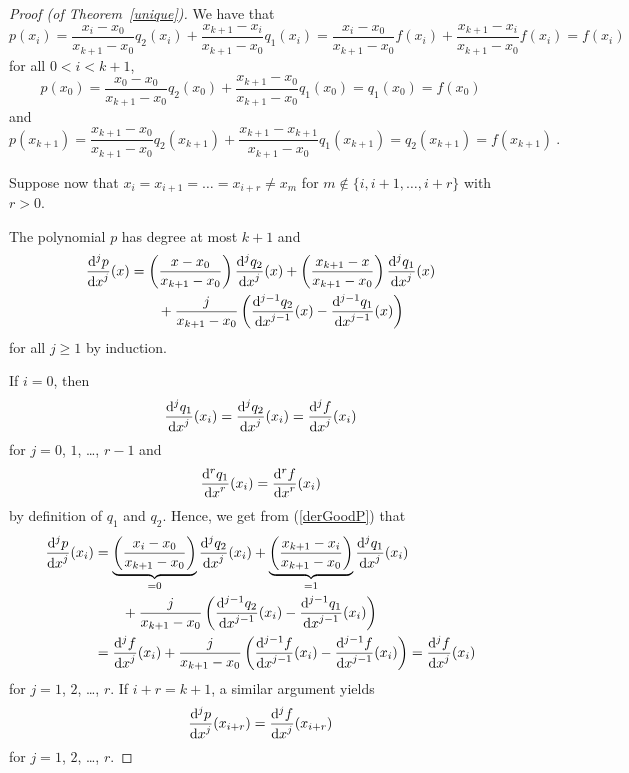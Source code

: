 \begin{proof}[Proof (of Theorem~\ref{unique})]
We have that
\[
p(x_i) = \frac{x_i-x_0}{x_{k+1}- x_0} q_2(x_i) +
\frac{x_{k+1}-x_i}{x_{k+1}- x_0} q_1(x_i)
= \frac{x_i-x_0}{x_{k+1}- x_0} f(x_i) +
\frac{x_{k+1}-x_i}{x_{k+1}- x_0} f(x_i) = f(x_i)
\]
for all $0<i<k+1$,
\[
p(x_0) = \frac{x_0-x_0}{x_{k+1}- x_0} q_2(x_0) +
\frac{x_{k+1}-x_0}{x_{k+1}- x_0} q_1(x_0)
= q_1(x_0) = f(x_0)
\]
and
\[
p(x_{k+1}) = \frac{x_{k+1}-x_0}{x_{k+1}- x_0} q_2(x_{k+1}) +
\frac{x_{k+1}-x_{k+1}}{x_{k+1}- x_0} q_1(x_{k+1})
= q_2(x_{k+1}) = f(x_{k+1}) \ .
\]

Suppose now that $x_i = x_{i+1} = \ldots = x_{i+r} \neq x_m$ for
$m \not\in \{i,i+1, \ldots, i+r\}$ with $r>0$.

The polynomial $p$ has degree at most $k+1$ and
\begin{equation}\label{derGoodP}
\begin{split}
\dydxn{p}{x}{j}(x)
&= \left(\frac{x-x_0}{x_{k+1}-x_0}\right)\dydxn{q_2}{x}{j}(x) +
\left(\frac{x_{k+1}-x}{x_{k+1}-x_0}\right) \dydxn{q_1}{x}{j}(x) \\
& \qquad + \frac{j}{x_{k+1}-x_0}\left(
\dydxn{q_2}{x}{j-1}(x)-\dydxn{q_1}{x}{j-1}(x)\right)
\end{split}
\end{equation}
for all $j\geq 1$ by induction.

If $i=0$, then
\[
\dydxn{q_1}{x}{j}(x_i) = \dydxn{q_2}{x}{j}(x_i) = \dydxn{f}{x}{j}(x_i)
\]
for $j=0$, $1$, \ldots, $r-1$ and
\[
\dydxn{q_1}{x}{r}(x_i) = \dydxn{f}{x}{r}(x_i)
\]
by definition of $q_1$ and $q_2$.  Hence, we get from (\ref{derGoodP})
that
\begin{align*}
\dydxn{p}{x}{j}(x_i)
& = \underbrace{\left(\frac{x_i-x_0}{x_{k+1}-x_0}\right)}_{=0}
\dydxn{q_2}{x}{j}(x_i) +
\underbrace{\left(\frac{x_{k+1}-x_i}{x_{k+1}-x_0}\right)}_{=1}
\dydxn{q_1}{x}{j}(x_i) \\
&\qquad  + \frac{j}{x_{k+1}-x_0}\left(
\dydxn{q_2}{x}{j-1}(x_i)-\dydxn{q_1}{x}{j-1}(x_i)\right) \\
&= \dydxn{f}{x}{j}(x_i) + \frac{j}{x_{k+1}-x_0}\left(
\dydxn{f}{x}{j-1}(x_i)-\dydxn{f}{x}{j-1}(x_i)\right)
= \dydxn{f}{x}{j}(x_i)
\end{align*}
for $j=1$, $2$, \ldots, $r$.  If $i+r=k+1$, a similar argument yields
\[
  \dydxn{p}{x}{j}(x_{i+r}) = \dydxn{f}{x}{j}(x_{i+r})
\]
for $j=1$, $2$, \ldots, $r$.


\end{proof}
